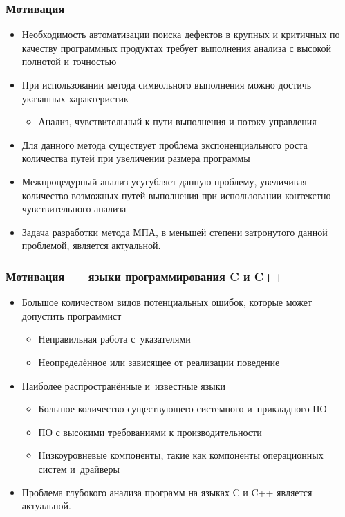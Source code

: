 \documentclass[14pt]{beamer}
\begin{document}
\begin{frame}[allowframebreaks]
\frametitle{Мотивация}
\begin{itemize}
  \item Необходимость автоматизации поиска дефектов в крупных и критичных по качеству программных продуктах требует выполнения анализа с высокой полнотой и точностью
  \item При использовании метода символьного выполнения можно достичь указанных характеристик
  \begin{itemize}
    \item Анализ, чувствительный к пути выполнения и потоку управления
  \end{itemize}

  \item Для данного метода существует проблема экспоненциального роста количества путей при увеличении размера программы
  \item Межпроцедурный анализ усугубляет данную проблему, увеличивая количество возможных путей выполнения при использовании контекстно-чувствительного анализа
  \item Задача разработки метода МПА, в меньшей степени затронутого данной проблемой, является актуальной.
\end{itemize}
\end{frame}

\begin{frame}[allowframebreaks]
\frametitle{Мотивация~--- языки программирования C и C++}
\begin{itemize}
  \item Большое количеством видов потенциальных ошибок, которые может допустить программист
  \begin{itemize}
    \item Неправильная работа с~указателями
    \item Неопределённое или зависящее от реализации поведение
  \end{itemize}
  \item Наиболее распространённые и~известные языки
    \begin{itemize}
    \item Большое количество существующего системного и~прикладного ПО
    \item ПО с высокими требованиями к производительности
    \item Низкоуровневые компоненты, такие как компоненты операционных систем и~драйверы
  \end{itemize}
  \item Проблема глубокого анализа программ на языках C и C++ является актуальной.
\end{itemize}
\end{frame}
\end{document}
